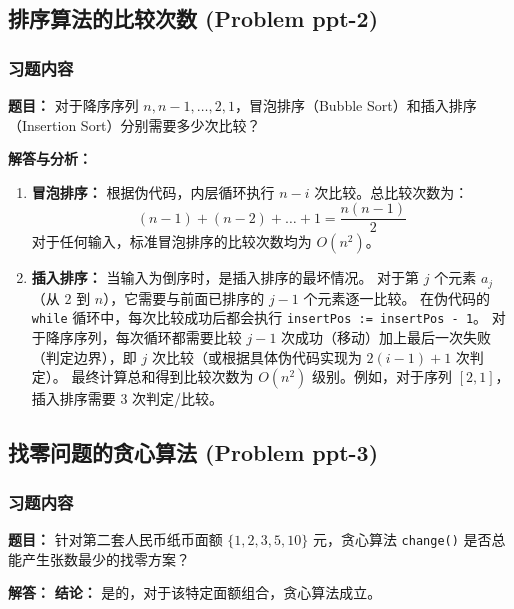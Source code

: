 \documentclass[11pt,UTF8]{article}
\begin{document}
\subsection{排序算法的比较次数 (Problem ppt-2)}

\subsubsection*{习题内容}
\textbf{题目：} 对于降序序列 $n, n-1, \dots, 2, 1$，冒泡排序（Bubble Sort）和插入排序（Insertion Sort）分别需要多少次比较？

\textbf{解答与分析：}
\begin{enumerate}[1.]
    \item \textbf{冒泡排序：}
    根据伪代码，内层循环执行 $n-i$ 次比较。总比较次数为：
    \[ (n-1) + (n-2) + \dots + 1 = \frac{n(n-1)}{2} \]
    对于任何输入，标准冒泡排序的比较次数均为 $O(n^2)$。

    \item \textbf{插入排序：}
    当输入为倒序时，是插入排序的最坏情况。
    对于第 $j$ 个元素 $a_j$（从 $2$ 到 $n$），它需要与前面已排序的 $j-1$ 个元素逐一比较。
    在伪代码的 \texttt{while} 循环中，每次比较成功后都会执行 \texttt{insertPos := insertPos - 1}。
    对于降序序列，每次循环都需要比较 $j-1$ 次成功（移动）加上最后一次失败（判定边界），即 $j$ 次比较（或根据具体伪代码实现为 $2(i-1)+1$ 次判定）。
    最终计算总和得到比较次数为 $O(n^2)$ 级别。例如，对于序列 $[2, 1]$，插入排序需要 3 次判定/比较。
\end{enumerate}

\subsection{找零问题的贪心算法 (Problem ppt-3)}

\subsubsection*{习题内容}
\textbf{题目：} 针对第二套人民币纸币面额 $\{1, 2, 3, 5, 10\}$ 元，贪心算法 \texttt{change()} 是否总能产生张数最少的找零方案？

\textbf{解答：}
\textbf{结论：} 是的，对于该特定面额组合，贪心算法成立。
\end{document}
